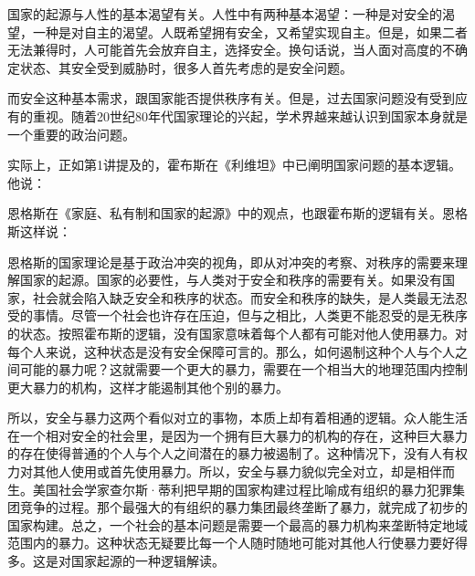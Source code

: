
国家的起源与人性的基本渴望有关。人性中有两种基本渴望：一种是对安全的渴望，一种是对自主的渴望。人既希望拥有安全，又希望实现自主。但是，如果二者无法兼得时，人可能首先会放弃自主，选择安全。换句话说，当人面对高度的不确定状态、其安全受到威胁时，很多人首先考虑的是安全问题。

而安全这种基本需求，跟国家能否提供秩序有关。但是，过去国家问题没有受到应有的重视。随着20世纪80年代国家理论的兴起，学术界越来越认识到国家本身就是一个重要的政治问题。

实际上，正如第1讲提及的，霍布斯在《利维坦》中已阐明国家问题的基本逻辑。他说：


恩格斯在《家庭、私有制和国家的起源》中的观点，也跟霍布斯的逻辑有关。恩格斯这样说：


恩格斯的国家理论是基于政治冲突的视角，即从对冲突的考察、对秩序的需要来理解国家的起源。国家的必要性，与人类对于安全和秩序的需要有关。如果没有国家，社会就会陷入缺乏安全和秩序的状态。而安全和秩序的缺失，是人类最无法忍受的事情。尽管一个社会也许存在压迫，但与之相比，人类更不能忍受的是无秩序的状态。按照霍布斯的逻辑，没有国家意味着每个人都有可能对他人使用暴力。对每个人来说，这种状态是没有安全保障可言的。那么，如何遏制这种个人与个人之间可能的暴力呢？这就需要一个更大的暴力，需要在一个相当大的地理范围内控制更大暴力的机构，这样才能遏制其他个别的暴力。

所以，安全与暴力这两个看似对立的事物，本质上却有着相通的逻辑。众人能生活在一个相对安全的社会里，是因为一个拥有巨大暴力的机构的存在，这种巨大暴力的存在使得普通的个人与个人之间潜在的暴力被遏制了。这种情况下，没有人有权力对其他人使用或首先使用暴力。所以，安全与暴力貌似完全对立，却是相伴而生。美国社会学家查尔斯·蒂利把早期的国家构建过程比喻成有组织的暴力犯罪集团竞争的过程。那个最强大的有组织的暴力集团最终垄断了暴力，就完成了初步的国家构建。总之，一个社会的基本问题是需要一个最高的暴力机构来垄断特定地域范围内的暴力。这种状态无疑要比每一个人随时随地可能对其他人行使暴力要好得多。这是对国家起源的一种逻辑解读。

